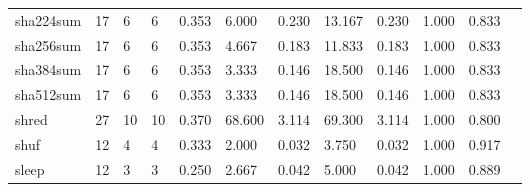 \begin{longtable}{lp{1.00cm}p{1.00cm}p{1.00cm}p{1.00cm}p{1.00cm}p{1.00cm}p{1.00cm}p{1.00cm}p{1.00cm}p{1.00cm}p{1.00cm}}
sha224sum &                           17 &                  6 &                                 6 &                                      0.353 &                                  6.000 &                                        0.230 &                            13.167 &                                   0.230 &                        1.000 &                                        0.833 \\
sha256sum &                           17 &                  6 &                                 6 &                                      0.353 &                                  4.667 &                                        0.183 &                            11.833 &                                   0.183 &                        1.000 &                                        0.833 \\
sha384sum &                           17 &                  6 &                                 6 &                                      0.353 &                                  3.333 &                                        0.146 &                            18.500 &                                   0.146 &                        1.000 &                                        0.833 \\
sha512sum &                           17 &                  6 &                                 6 &                                      0.353 &                                  3.333 &                                        0.146 &                            18.500 &                                   0.146 &                        1.000 &                                        0.833 \\
shred     &                           27 &                 10 &                                10 &                                      0.370 &                                 68.600 &                                        3.114 &                            69.300 &                                   3.114 &                        1.000 &                                        0.800 \\
shuf      &                           12 &                  4 &                                 4 &                                      0.333 &                                  2.000 &                                        0.032 &                             3.750 &                                   0.032 &                        1.000 &                                        0.917 \\
sleep     &                           12 &                  3 &                                 3 &                                      0.250 &                                  2.667 &                                        0.042 &                             5.000 &                                   0.042 &                        1.000 &                                        0.889 \\

\end{longtable}
